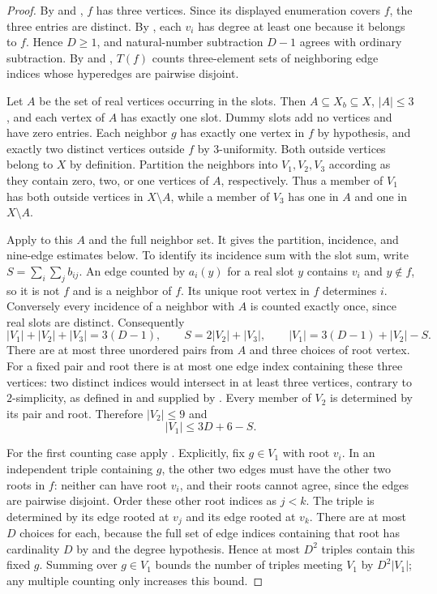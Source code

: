 \begin{proof}
By  and , $f$ has
three vertices. Since its displayed enumeration covers $f$, the three
entries are distinct. By , each $v_i$ has
degree at least one because it belongs to $f$. Hence $D\ge1$, and
natural-number subtraction $D-1$ agrees with ordinary subtraction.
By  and ,
$T(f)$ counts three-element sets of neighboring edge indices whose
hyperedges are pairwise disjoint.

Let $A$ be the set of real vertices occurring in the slots. Then
$A\subseteq X_b\subseteq X$, $|A|\le3$, and each vertex of $A$ has
exactly one slot. Dummy slots add no vertices and have zero entries.
Each neighbor $g$ has exactly one vertex in $f$ by hypothesis, and
exactly two distinct vertices outside $f$ by $3$-uniformity. Both
outside vertices belong to $X$ by definition. Partition the neighbors
into $V_1,V_2,V_3$ according as they contain zero, two, or one vertices
of $A$, respectively. Thus a member of $V_1$ has both outside vertices
in $X\setminus A$, while a member of $V_3$ has one in $A$ and one in
$X\setminus A$.

Apply  to this $A$
and the full neighbor set. It gives the partition, incidence, and
nine-edge estimates below. To identify its incidence sum with the
slot sum, write $S=\sum_i\sum_j b_{ij}$. An edge counted by $a_i(y)$ for a
real slot $y$ contains $v_i$ and $y\notin f$, so it is not $f$ and is
a neighbor of $f$. Its unique root vertex in $f$ determines $i$.
Conversely every incidence of a neighbor with $A$ is counted exactly
once, since real slots are distinct. Consequently
\[
|V_1|+|V_2|+|V_3|=3(D-1),\qquad S=2|V_2|+|V_3|,
\qquad |V_1|=3(D-1)+|V_2|-S.
\]
There are at most three unordered pairs from $A$ and three choices of
root vertex. For a fixed pair and root there is at most one edge index
containing these three vertices: two distinct indices would intersect
in at least three vertices, contrary to $2$-simplicity, as defined in
 and supplied by .
Every member of $V_2$ is determined by its pair and root. Therefore
$|V_2|\le9$ and
\[
|V_1|\le3D+6-S.
\]

For the first counting case apply
.
Explicitly, fix $g\in V_1$ with root $v_i$. In an independent triple containing
$g$, the other two edges must have the other two roots in $f$: neither
can have root $v_i$, and their roots cannot agree, since the edges are
pairwise disjoint. Order these other root indices as $j<k$. The triple
is determined by its edge rooted at $v_j$ and its edge rooted at $v_k$.
There are at most $D$ choices for each, because the full set of edge
indices containing that root has cardinality $D$ by
 and the degree hypothesis. Hence at most
$D^2$ triples contain this fixed $g$. Summing over $g\in V_1$ bounds
the number of triples meeting $V_1$ by $D^2|V_1|$; any multiple counting
only increases this bound.


\end{proof}
